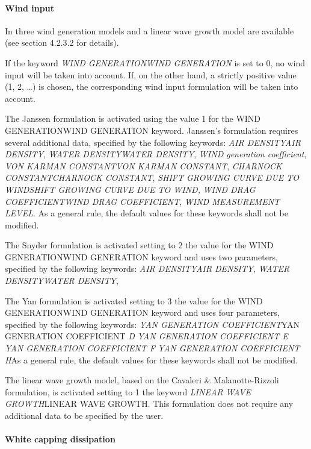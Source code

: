 \paragraph{ Wind input}

 In \tomawac three wind generation models and a linear wave growth model are available (see section 4.2.3.2 for details).

 If the keyword \textit{WIND GENERATIONWIND GENERATION} is set to 0, no wind input will be taken into account. If, on the other hand, a strictly positive value (1, 2, \dots ) is chosen, the corresponding wind input formulation will be taken into account.

 The Janssen formulation is activated using the value 1 for the WIND GENERATIONWIND GENERATION keyword. Janssen's formulation requires several additional data, specified by the following keywords:   \textit{AIR DENSITYAIR DENSITY},   \textit{WATER DENSITYWATER DENSITY},   \textit{WIND generation coefficient},   \textit{VON KARMAN CONSTANTVON KARMAN CONSTANT},   \textit{CHARNOCK CONSTANTCHARNOCK CONSTANT},   \textit{SHIFT GROWING CURVE DUE TO WINDSHIFT GROWING CURVE DUE TO WIND,}  \textit{WIND DRAG COEFFICIENTWIND DRAG COEFFICIENT},   \textit{WIND MEASUREMENT LEVEL}.  As a general rule, the default values for these keywords shall not be modified.



 The Snyder formulation is activated setting to 2 the value for the WIND GENERATIONWIND GENERATION keyword and uses two parameters, specified by the following keywords:   \textit{AIR DENSITYAIR DENSITY},   \textit{WATER DENSITYWATER DENSITY},

 The Yan formulation is activated setting to 3 the value for the WIND GENERATIONWIND GENERATION keyword and uses four parameters, specified by the following keywords:   \textit{YAN GENERATION COEFFICIENT}YAN GENERATION COEFFICIENT\textit{ D}  \textit{YAN GENERATION COEFFICIENT E} \textit{YAN GENERATION COEFFICIENT F} \textit{YAN GENERATION COEFFICIENT H}As a general rule, the default values for these keywords shall not be modified.



 The linear wave growth model, based on the Cavaleri \& Malanotte-Rizzoli formulation, is activated setting to 1 the keyword \textit{LINEAR WAVE GROWTH}LINEAR WAVE GROWTH. This formulation does not require any additional data to be specified by the user.


\paragraph{ White capping dissipation}

